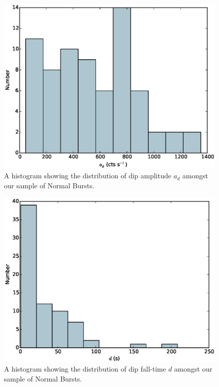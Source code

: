 \begin{figure}
  \centering
  \includegraphics[width=.9\linewidth, trim={0cm 0 0cm 0},clip]{images/appendix_dip_pa_hist.eps}
  \caption{\small A histogram showing the distribution of dip amplitude $a_d$ amongst our sample of Normal Bursts.}
  \label{fig:app_hist_ad}
\end{figure}

\begin{figure}
  \centering
  \includegraphics[width=.9\linewidth, trim={0cm 0 0cm 0},clip]{images/appendix_div_hist.eps}
  \caption{\small A histogram showing the distribution of dip fall-time $d$ amongst our sample of Normal Bursts.}
  \label{fig:app_hist_d}
\end{figure}

